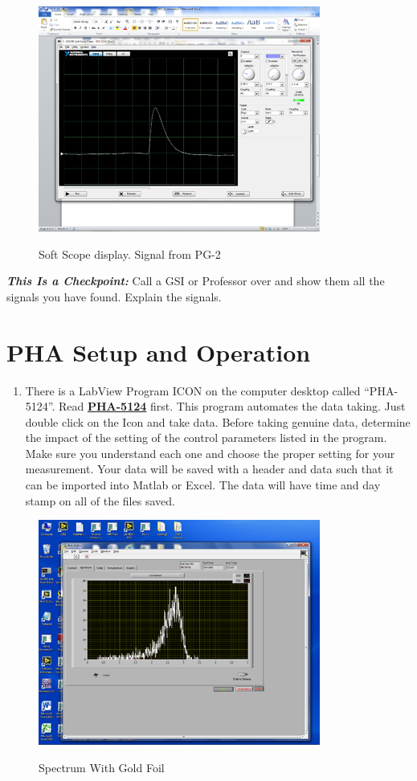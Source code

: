 \documentclass{../lab}
\begin{document}
\begin{figure}[h]
    \centering
    \href{http://experimentationlab.berkeley.edu/sites/default/files/images/350px-RUT_Soft_Scope.png}{\includegraphics[width=0.5\linewidth]{images/350px-RUT_Soft_Scope.png}}
    \caption{Soft Scope display. Signal from PG-2}
    \label{fig:SoftScopeDisplay}
\end{figure}

\emph{\textbf{This Is a Checkpoint:}} Call a GSI or Professor over and show them all the signals you have found. Explain the signals.

\section{PHA Setup and Operation}

\begin{enumerate}
    \item There is a LabView Program ICON on the computer desktop called ``PHA-5124''. Read \href{http://experimentationlab.berkeley.edu/PHA-5124Program}{\textbf{PHA-5124}} first. This program automates the data taking. Just double click on the Icon and take data. Before taking genuine data, determine the impact of the setting of the control parameters listed in the program. Make sure you understand each one and choose the proper setting for your measurement. Your data will be saved with a header and data such that it can be imported into Matlab or Excel. The data will have time and day stamp on all of the files saved.

\end{enumerate}

\begin{figure}[h]
    \centering
    \href{http://experimentationlab.berkeley.edu/sites/default/files/images/350px-RUT_Spectrum_with_Foil.png}{\includegraphics[width=0.5\linewidth]{images/350px-RUT_Spectrum_with_Foil.png}}
    \caption{Spectrum With Gold Foil}
    \label{fig:350px-RUT_Spectrum_with_Foil}
\end{figure}
\end{document}
